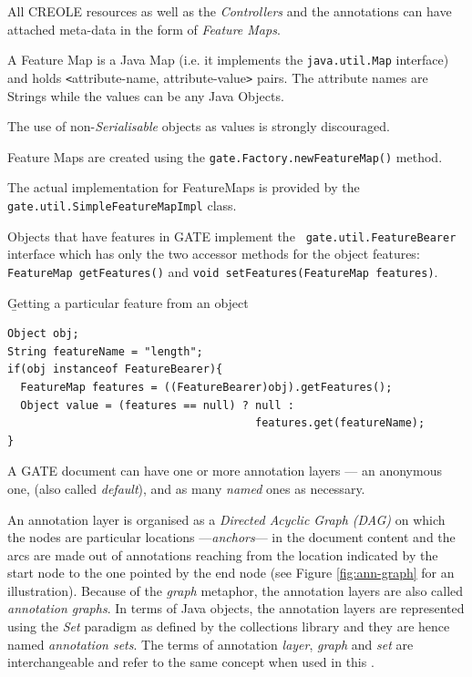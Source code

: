 All CREOLE resources as well as the {\em Controllers} and the annotations
can have attached meta-data in the form of {\em Feature Maps}.

A Feature Map is a Java Map (i.e. it implements the {\tt java.util.Map}
interface) and holds \verb!<!attribute-name, attribute-value\verb!>! pairs.
The attribute names are Strings while the values can be any Java Objects.

The use of non-{\em Serialisable} objects as values is strongly discouraged.

Feature Maps are created using the {\tt gate.Factory.newFeatureMap()}
method.

The actual implementation for FeatureMaps is provided by the \linebreak\ {\tt
gate.util.SimpleFeatureMapImpl} class.

Objects that have features in GATE implement the {\tt
gate.util.FeatureBearer} interface which has only the two accessor methods
for the object features: {\tt FeatureMap getFeatures()} and {\tt void
setFeatures(FeatureMap features)}.

\begin{minipage}{\textwidth}
{\b Getting a particular feature from an object}


\begin{lstlisting}
Object obj;
String featureName = "length";
if(obj instanceof FeatureBearer){
  FeatureMap features = ((FeatureBearer)obj).getFeatures();
  Object value = (features == null) ? null :
                                      features.get(featureName);
}
\end{lstlisting}

\end{minipage}



A GATE document can have one or more annotation layers --- an anonymous one,
(also called {\em default}), and as many {\em named} ones as necessary.

An annotation layer is organised as a \emph{Directed Acyclic Graph (DAG)} on
which the nodes are particular locations ---\emph{anchors}--- in the document content
and the arcs are made out of annotations reaching from the location indicated
by the start node to the one pointed by the end node (see Figure
\ref{fig:ann-graph} for an illustration). Because of the \emph{graph} metaphor,
the annotation layers are also called \emph{annotation graphs}.
In terms of Java objects, the annotation layers are represented using
the \emph{Set} paradigm as defined by the collections library and they are hence
named \emph{annotation sets}. The terms of annotation \emph{layer}, \emph{graph}
and \emph{set} are interchangeable and refer to the same concept when used in
this \thing{}.

